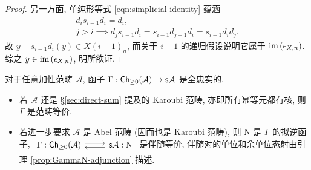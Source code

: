 \begin{proof}
	另一方面, 单纯形等式 \eqref{eqn:simplicial-identity} 蕴涵
	\begin{gather*}
		d_i s_{i-1} d_i = d_i, \\
		j > i \implies d_j s_{i-1} d_i = s_{i-1} d_{j-1} d_i = s_{i-1}  d_i d_j.
	\end{gather*}
	故 $y - s_{i-1} d_i(y) \in X(i-1)_n$, 而关于 $i-1$ 的递归假设说明它属于 $\operatorname{im}\left( \epsilon_{X, n} \right)$. 综之 $y \in \operatorname{im}\left( \epsilon_{X, n} \right)$, 明所欲证.
\end{proof}

\begin{theorem}\label{prop:Dold-Kan}
	对于任意加性范畴 $\mathcal{A}$, 函子 $\Gamma: \mathsf{Ch}_{\geq 0}(\mathcal{A}) \to \mathsf{s}\mathcal{A}$ 是全忠实的.
	\begin{itemize}
		\item 若 $\mathcal{A}$ 还是 \S\ref{sec:direct-sum} 提及的 Karoubi 范畴, 亦即所有幂等元都有核, 则 $\Gamma$ 是范畴等价.
		\item 若进一步要求 $\mathcal{A}$ 是 Abel 范畴 (因而也是 Karoubi 范畴), 则 $\mathrm{N}$ 是 $\Gamma$ 的拟逆函子,
		$\begin{tikzcd}
			\Gamma: \cate{Ch}_{\geq 0}(\mathcal{A}) \arrow[shift left, r] & \cate{s}\mathcal{A} : \mathrm{N} \arrow[shift left, l]
		\end{tikzcd}$
		是伴随等价, 伴随对的单位和余单位态射由引理 \ref{prop:GammaN-adjunction} 描述.
	\end{itemize}
\end{theorem}
